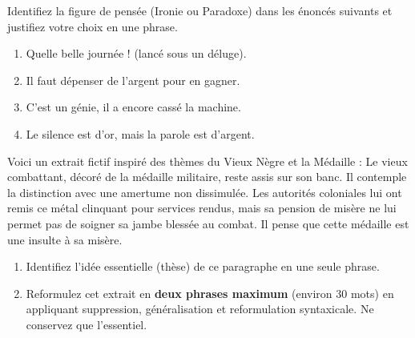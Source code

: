 \documentclass[11pt]{article}
\begin{document}
\begin{exercice}
Identifiez la figure de pensée (Ironie ou Paradoxe) dans les énoncés suivants et justifiez votre choix en une phrase.
\begin{enumerate}
    \item \og Quelle belle journée ! \fg{} (lancé sous un déluge).
    \item \og Il faut dépenser de l'argent pour en gagner. \fg
    \item \og C'est un génie, il a encore cassé la machine. \fg
    \item \og Le silence est d'or, mais la parole est d'argent. \fg
\end{enumerate}
\end{exercice}

\begin{exercice}
Voici un extrait fictif inspiré des thèmes du \og Vieux Nègre et la Médaille \fg :
\og Le vieux combattant, décoré de la médaille militaire, reste assis sur son banc. Il contemple la distinction avec une amertume non dissimulée. Les autorités coloniales lui ont remis ce métal clinquant pour services rendus, mais sa pension de misère ne lui permet pas de soigner sa jambe blessée au combat. Il pense que cette médaille est une insulte à sa misère. \fg
\begin{enumerate}
    \item Identifiez l'idée essentielle (thèse) de ce paragraphe en une seule phrase.
    \item Reformulez cet extrait en \textbf{deux phrases maximum} (environ 30 mots) en appliquant suppression, généralisation et reformulation syntaxicale. Ne conservez que l'essentiel.
\end{enumerate}
\end{exercice}
\end{document}
